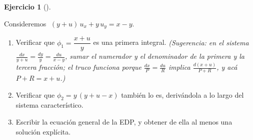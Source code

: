 \documentclass[
  spanish,
  a4paper,
]{scrbook}
\providecommand{\tightlist}{%
  \setlength{\itemsep}{0pt}\setlength{\parskip}{0pt}}
\theoremstyle{definition}
\theoremstyle{plain}
\theoremstyle{definition}
\theoremstyle{plain}
\theoremstyle{definition}
\newtheorem{exercise}{Ejercicio}[chapter]
\theoremstyle{remark}
\begin{document}
\begin{exercise}[]\protect\hypertarget{exr-general}{}\label{exr-general}

Consideremos \(\;(y+u)\,u_x + y\,u_y = x-y\).

\begin{enumerate}
\def\labelenumi{\alph{enumi}.}
\tightlist
\item
  Verificar que \(\phi_1 = \dfrac{x+u}{y}\) es una primera integral.
  \emph{(Sugerencia: en el sistema
  \(\frac{dx}{y+u} = \frac{dy}{y} = \frac{du}{x-y}\), sumar el numerador
  y el denominador de la primera y la tercera fracción; el truco
  funciona porque \(\frac{dx}{P}=\frac{du}{R}\) implica
  \(\frac{d(x+u)}{P+R}\), y acá \(P+R = x+u\).)}
\item
  Verificar que \(\phi_2 = y\,(y+u-x)\) también lo es, derivándola a lo
  largo del sistema característico.
\item
  Escribir la ecuación general de la EDP, y obtener de ella al menos una
  solución explícita.
\end{enumerate}

\end{exercise}
\end{document}
